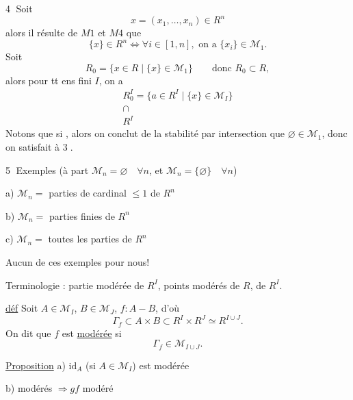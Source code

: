 \textcircled{4} Soit 
\[
x=(x_1,\ldots,x_n)\in R^n
\]
alors il résulte de $M1$ et $M4$ que
\[
\{x\}\in R^n\Longleftrightarrow\forall i\in[1,n],\text{ on a }\{x_i\}\in\mathcal M_1.
\]
Soit
\[
R_0=\{x\in R\mid\{x\}\in\mathcal M_1\}\qquad\text{donc }R_0\subset R,
\]
alors pour tt ens fini $I$, on a
\[
\begin{array}{l}
R_0^I=\{a\in R^I\mid\{x\}\in\mathcal M_I\}\\
\cap\\
R^I
\end{array}
\]
Notons que si  , alors on conclut de la stabilité  par intersection que $\varnothing\in\mathcal M_1$, donc on satisfait à \textcircled{3}.

\textcircled{5} Exemples (à part $\mathcal M_n=\varnothing\quad\forall n$, et $\mathcal M_n=\{\varnothing\}\quad\forall n$)

a) $\mathcal M_n=$ parties de cardinal $\le1$ de $R^n$

b) $\mathcal M_n=$ parties finies de $R^n$

c) $\mathcal M_n=$ toutes les parties de $R^n$

Aucun de ces exemples   pour nous!


Terminologie : partie modérée de $R^I$, points modérés de $R$, de $R^I$.

\uline{déf} Soit $A\in\mathcal M_I$, $B\in\mathcal M_J$, $f:A\mathbin{-}B$, d'où
\[
\Gamma_f\subset A\times B\subset R^I\times R^J\simeq R^{I\cup J}.
\]
On dit que $f$ est \uline{modérée} si
\[
\Gamma_f\in\mathcal M_{I\cup J}.
\]

\uline{Proposition} a) $\mathrm{id}_A$ (si $A\in\mathcal M_I$) est modérée

b)  modérés $\Longrightarrow gf$ modéré

